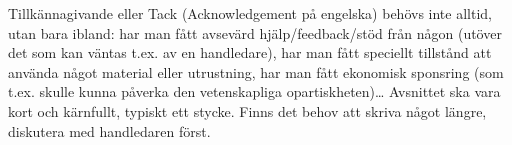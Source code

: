 Till\-känna\-gi\-van\-de eller Tack (Acknowledgement på engelska) behövs inte alltid, utan bara ibland: har man fått avsevärd hjälp/feedback/stöd från någon (utöver det som kan väntas t.ex. av en handledare), har man fått speciellt tillstånd att använda något material eller utrustning, har man fått ekonomisk sponsring (som t.ex. skulle kunna påverka den vetenskapliga opartiskheten)\ldots
Avsnittet ska vara kort och kärnfullt, typiskt ett stycke. Finns det behov att skriva något längre, diskutera med handledaren först.


